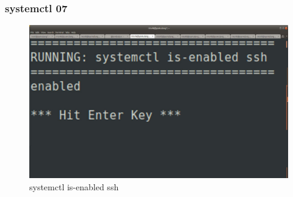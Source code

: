 \documentclass[aspectratio=169, xcolor=table, notheorems, hyperref={pdfpagelabels=false}]{beamer}
\begin{document}
\begin{frame}[fragile]
\frametitle{systemctl 07}
\begin{figure}
\includegraphics[width=.74\linewidth]{os-systemd06.jpg}
\caption{systemctl is-enabled ssh}
\end{figure}
\begin{table}
\end{table}
\end{frame}

\end{document}
